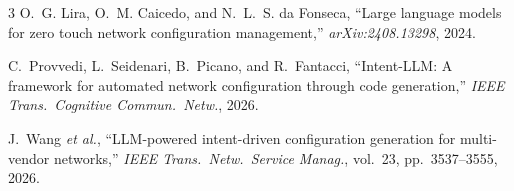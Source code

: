 \documentclass[10pt]{article}
\begin{document}
	\begin{thebibliography}{3}
		O.~G. Lira, O.~M. Caicedo, and N.~L.~S. da Fonseca, ``Large language models for zero touch network configuration management,'' \emph{arXiv:2408.13298}, 2024.

		C.~Provvedi, L.~Seidenari, B.~Picano, and R.~Fantacci, ``Intent-LLM: A framework for automated network configuration through code generation,'' \emph{IEEE Trans.\ Cognitive Commun.\ Netw.}, 2026.

		J.~Wang \emph{et al.}, ``LLM-powered intent-driven configuration generation for multi-vendor networks,'' \emph{IEEE Trans.\ Netw.\ Service Manag.}, vol.~23, pp.~3537--3555, 2026.
	\end{thebibliography}
	
\end{document}

